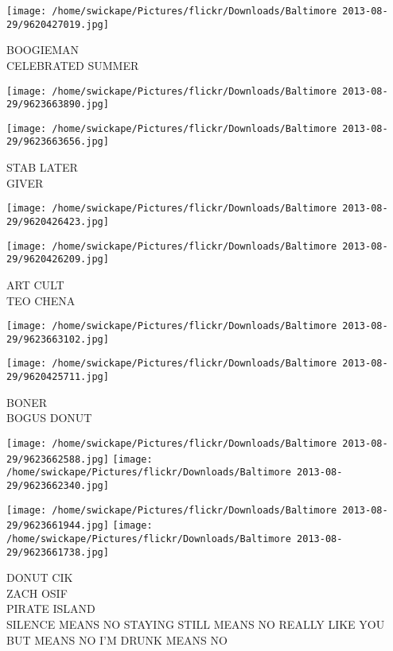 \documentclass[10pt,letterpaper]{article}
\begin{document}
\vspace{0.25in}
\texttt{[image: /home/swickape/Pictures/flickr/Downloads/Baltimore 2013-08-29/9620427019.jpg]}

BOOGIEMAN\\
CELEBRATED SUMMER\\
\pagebreak

\texttt{[image: /home/swickape/Pictures/flickr/Downloads/Baltimore 2013-08-29/9623663890.jpg]}

\vspace{0.25in}
\texttt{[image: /home/swickape/Pictures/flickr/Downloads/Baltimore 2013-08-29/9623663656.jpg]}

STAB LATER\\
GIVER\\
\pagebreak

\texttt{[image: /home/swickape/Pictures/flickr/Downloads/Baltimore 2013-08-29/9620426423.jpg]}

\vspace{0.25in}
\texttt{[image: /home/swickape/Pictures/flickr/Downloads/Baltimore 2013-08-29/9620426209.jpg]}

ART CULT\\
TEO CHENA\\
\pagebreak

\texttt{[image: /home/swickape/Pictures/flickr/Downloads/Baltimore 2013-08-29/9623663102.jpg]}

\vspace{0.25in}
\texttt{[image: /home/swickape/Pictures/flickr/Downloads/Baltimore 2013-08-29/9620425711.jpg]}

BONER\\
BOGUS DONUT\\
\pagebreak

\texttt{[image: /home/swickape/Pictures/flickr/Downloads/Baltimore 2013-08-29/9623662588.jpg]}
\texttt{[image: /home/swickape/Pictures/flickr/Downloads/Baltimore 2013-08-29/9623662340.jpg]}

\texttt{[image: /home/swickape/Pictures/flickr/Downloads/Baltimore 2013-08-29/9623661944.jpg]}
\texttt{[image: /home/swickape/Pictures/flickr/Downloads/Baltimore 2013-08-29/9623661738.jpg]}

DONUT CIK\\
ZACH OSIF\\
PIRATE ISLAND\\
SILENCE MEANS NO STAYING STILL MEANS NO REALLY LIKE YOU BUT MEANS NO I'M DRUNK MEANS NO\\
\pagebreak
\end{document}
